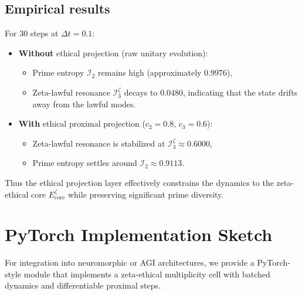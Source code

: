 \documentclass[11pt]{article}
\begin{document}
\subsection{Empirical results}

For $30$ steps at $\Delta t=0.1$:
\begin{itemize}[leftmargin=*]
  \item \textbf{Without} ethical projection (raw unitary evolution):
    \begin{itemize}
      \item Prime entropy $\mathcal{I}_2$ remains high (approximately $0.9976$),
      \item Zeta-lawful resonance $\mathcal{I}_3^{\zeta}$ decays to $0.0480$,
            indicating that the state drifts away from the lawful modes.
    \end{itemize}
  \item \textbf{With} ethical proximal projection ($c_2=0.8$, $c_3=0.6$):
    \begin{itemize}
      \item Zeta-lawful resonance is stabilized at $\mathcal{I}_3^{\zeta}\approx 0.6000$,
      \item Prime entropy settles around $\mathcal{I}_2\approx 0.9113$.
    \end{itemize}
\end{itemize}
Thus the ethical projection layer effectively constrains the dynamics to the zeta-ethical core
$E_{\mathrm{core}}^{\zeta}$ while preserving significant prime diversity.

\section{PyTorch Implementation Sketch}

For integration into neuromorphic or AGI architectures, we provide a PyTorch-style module that
implements a zeta-ethical multiplicity cell with batched dynamics and differentiable proximal steps.
\end{document}
